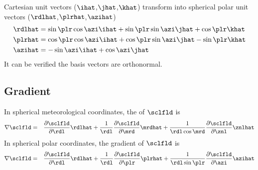 \documentclass[12pt,twoside]{book}
\begin{document}
Cartesian unit vectors ($\ihat$,$\jhat$,$\khat$) transform into
spherical polar unit vectors ($\rdlhat$,$\plrhat$,$\azihat$)
\begin{subequations}
\begin{align}
\rdlhat & = \sin\plr\cos\azi\ihat + \sin\plr\sin\azi\jhat + \cos\plr\khat \\
\plrhat & = \cos\plr\cos\azi\ihat + \cos\plr\sin\azi\jhat - \sin\plr\khat \\
\azihat & = -\sin\azi\ihat + \cos\azi\jhat
\label{eqn:crt_sph_unit_vct_trn}
\end{align}
\end{subequations}
It can be verified the basis vectors are orthonormal.

\subsection[Gradient]{Gradient}\label{sxn:grd_sph}
In spherical meteorological coordinates, the  of $\sclfld$ is 
\begin{eqnarray}
\nabla \sclfld & = & 
\frac{\partial \sclfld}{\partial \rdl} \rdlhat + 
\frac{1}{\rdl} \frac{\partial \sclfld}{\partial \mrd} \mrdhat + 
\frac{1}{\rdl \cos \mrd} \frac{\partial \sclfld}{\partial \znl} \znlhat
\label{eqn:grd_sph_mtr}
\end{eqnarray}
In spherical polar coordinates, the gradient of $\sclfld$ is 
\begin{eqnarray}
\nabla \sclfld & = & 
\frac{\partial \sclfld}{\partial \rdl} \rdlhat + 
\frac{1}{\rdl} \frac{\partial \sclfld}{\partial \plr} \plrhat + 
\frac{1}{\rdl \sin \plr} \frac{\partial \sclfld}{\partial \azi} \azihat
\label{eqn:grd_sph_plr}
\end{eqnarray}
\end{document}

